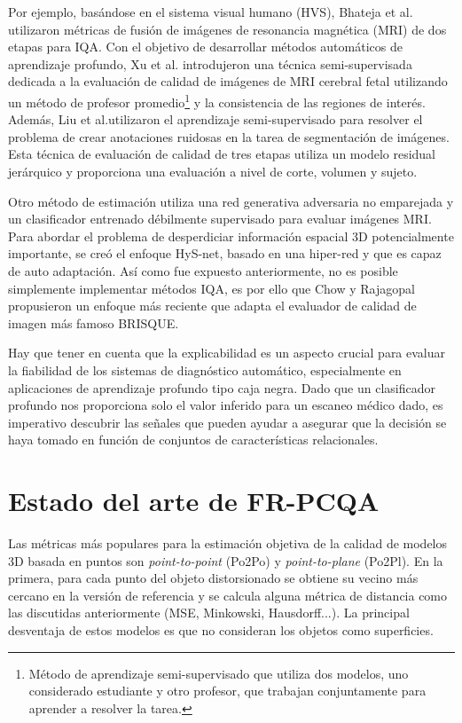 Por ejemplo, basándose en el sistema visual humano (HVS), 
Bhateja et al.\cite{MultiModalMRIFusionMethod} utilizaron métricas de fusión
de imágenes de resonancia magnética (MRI) de dos etapas para IQA.
Con el objetivo de desarrollar métodos automáticos de aprendizaje profundo,
Xu et al.\cite{SemiSupervisedMRIFetalBrain} introdujeron una técnica semi-supervisada dedicada a la evaluación de 
calidad de imágenes de MRI cerebral fetal utilizando un método de 
profesor promedio\footnote{
Método de aprendizaje semi-supervisado que utiliza dos modelos, 
uno considerado estudiante y otro profesor, que trabajan conjuntamente para aprender
a resolver la tarea.
} y la consistencia de las regiones de interés. 
Además, Liu et al.\cite{IQAForPediatricMRIWithNoisySegmentation}utilizaron el aprendizaje semi-supervisado para resolver 
el problema de crear anotaciones ruidosas en la tarea de segmentación de imágenes. 
Esta técnica de evaluación de calidad de tres etapas utiliza un modelo residual 
jerárquico y proporciona una evaluación a nivel de corte, volumen y sujeto. 

Otro método de estimación utiliza una red generativa adversaria no emparejada 
y un clasificador entrenado débilmente supervisado para evaluar imágenes MRI\cite{MIGAN}.
Para abordar el problema de desperdiciar información espacial 3D potencialmente importante, 
se creó el enfoque HyS-net\cite{Hys-net}, basado en una hiper-red y que es capaz de 
auto adaptación. Así como fue expuesto anteriormente, no es posible 
simplemente implementar métodos IQA, es por ello que Chow y Rajagopal \cite{MedicalBRISQUE} 
propusieron un enfoque más reciente que adapta el evaluador de calidad de imagen más famoso BRISQUE\cite{BRISQUE}.

Hay que tener en cuenta que la explicabilidad es un aspecto crucial 
para evaluar la fiabilidad de los sistemas de diagnóstico automático, 
especialmente en aplicaciones de aprendizaje profundo tipo caja negra. 
Dado que un clasificador profundo nos proporciona solo el valor inferido 
para un escaneo médico dado, es imperativo descubrir las señales que pueden 
ayudar a asegurar que la decisión se haya tomado en función de conjuntos de 
características relacionales.

\section{Estado del arte de FR-PCQA}
Las métricas más populares para la estimación objetiva de la calidad de modelos 
3D basada en puntos son \emph{point-to-point} (Po2Po)\cite{PointToPoint} y
\emph{point-to-plane} (Po2Pl)\cite{PointToPlane}. 
En la primera, para cada punto del objeto distorsionado se obtiene su vecino más cercano en la versión de referencia y 
se calcula alguna métrica de distancia como las discutidas anteriormente (MSE, Minkowski, Hausdorff...). 
La principal desventaja de estos modelos es que no consideran los objetos como 
superficies.

